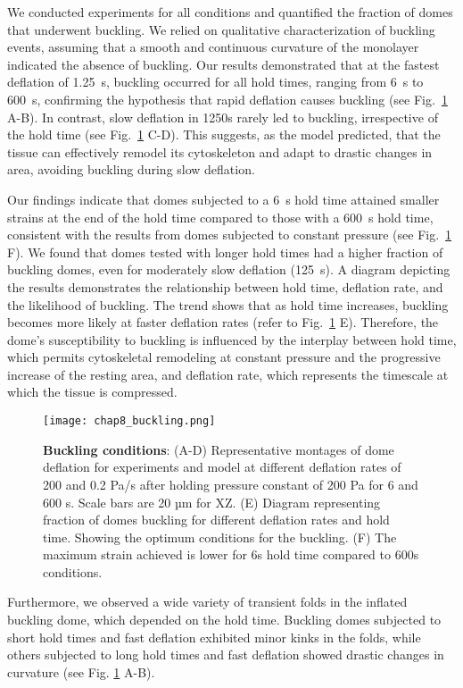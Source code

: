 We conducted experiments for all conditions and quantified the fraction of domes that underwent buckling. We relied on qualitative characterization of buckling events, assuming that a smooth and continuous curvature of the monolayer indicated the absence of buckling. Our results demonstrated that at the fastest deflation of 1.25~s, buckling occurred for all hold times, ranging from 6~s to 600~s, confirming the hypothesis that rapid deflation causes buckling (see Fig.~\ref{fig_8_3} A-B). In contrast, slow deflation in 1250s rarely led to buckling, irrespective of the hold time (see Fig.~\ref{fig_8_3} C-D). This suggests, as the model predicted, that the tissue can effectively remodel its cytoskeleton and adapt to drastic changes in area, avoiding buckling during slow deflation.

Our findings indicate that domes subjected to a 6~s hold time attained smaller strains at the end of the hold time compared to those with a 600~s hold time, consistent with the results from domes subjected to constant pressure (see Fig.~\ref{fig_8_3} F). We found that domes tested with longer hold times had a higher fraction of buckling domes, even for moderately slow deflation (125~s). A  diagram depicting the results demonstrates the relationship between hold time, deflation rate, and the likelihood of buckling. The trend shows that as hold time increases, buckling becomes more likely at faster deflation rates (refer to Fig.~\ref{fig_8_3} E). Therefore, the dome's susceptibility to buckling is influenced by the interplay between hold time, which permits cytoskeletal remodeling at constant pressure and the progressive increase of the resting area, and deflation rate, which represents the timescale at which the tissue is compressed.

\begin{figure}[b!]
	\centering
	\texttt{[image: chap8\_buckling.png]}
	\caption{\label{fig_8_3} \textbf{Buckling conditions}: (A-D) Representative montages of dome deflation for experiments and model at different deflation rates of 200 and 0.2 Pa/s after holding pressure constant of 200 Pa for 6 and 600 s. Scale bars are 20 µm for XZ. (E) Diagram representing fraction of domes buckling for different deflation rates and hold time. Showing the optimum conditions for the buckling. (F) The maximum strain achieved is lower for 6s hold time compared to 600s conditions.}
\end{figure}

Furthermore, we observed a wide variety of transient folds in the inflated buckling dome, which depended on the hold time. Buckling domes subjected to short hold times and fast deflation exhibited minor kinks in the folds, while others subjected to long hold times and fast deflation showed drastic changes in curvature (see Fig. \ref{fig_8_3} A-B).

